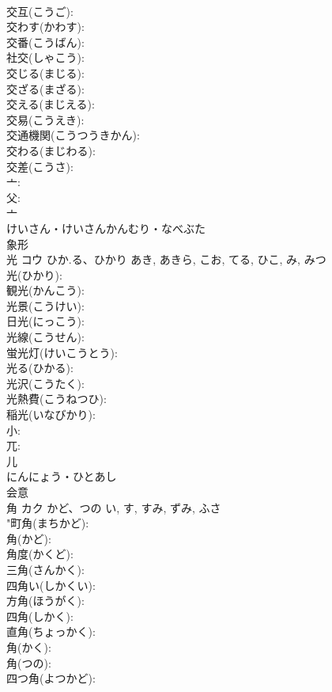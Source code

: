 \documentclass[8pt]{extreport}
\begin{document}
\begin{CJK}{UTF8}{min}
\\	交互(こうご): 
\\	交わす(かわす): 
\\	交番(こうばん): 
\\	社交(しゃこう): 
\\	交じる(まじる): 
\\	交ざる(まざる): 
\\	交える(まじえる): 
\\	交易(こうえき): 
\\	交通機関(こうつうきかん): 
\\	交わる(まじわる): 
\\	交差(こうさ): 
\\	亠: 
\\	父: 
\\	亠	
\\	けいさん・けいさんかんむり・なべぶた	
\\	象形 
\\	光	コウ	ひか.る、ひかり	あき, あきら, こお, てる, ひこ, み, みつ	
\\	光(ひかり): 
\\	観光(かんこう): 
\\	光景(こうけい): 
\\	日光(にっこう): 
\\	光線(こうせん): 
\\	蛍光灯(けいこうとう): 
\\	光る(ひかる): 
\\	光沢(こうたく): 
\\	光熱費(こうねつひ): 
\\	稲光(いなびかり): 
\\	小: 
\\	兀: 
\\	儿	
\\	にんにょう・ひとあし	
\\	会意 
\\	角	カク	かど、つの	い, す, すみ, ずみ, ふさ	
\\	"町角(まちかど): 
\\	角(かど): 
\\	角度(かくど): 
\\	三角(さんかく): 
\\	四角い(しかくい): 
\\	方角(ほうがく): 
\\	四角(しかく): 
\\	直角(ちょっかく): 
\\	角(かく): 
\\	角(つの): 
\\	四つ角(よつかど): 

\end{CJK}
\end{document}
